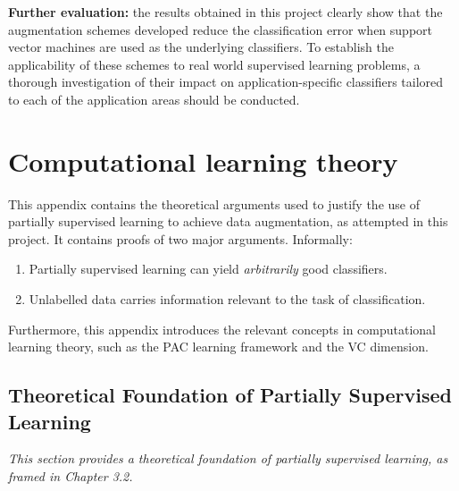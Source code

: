 \documentclass[12pt,twoside,notitlepage,amsart]{report} %
\begin{document}
\textbf{Further evaluation:} the results obtained in this project clearly show that the augmentation schemes developed reduce the classification error when support vector machines are used as the underlying classifiers. To establish the applicability of these schemes to real world supervised learning problems, a thorough investigation of their impact on application-specific classifiers tailored to each of the application areas should be conducted. 

	
		
	
	
	\cleardoublepage
	
	
	
	\cleardoublepage
	
	\appendix %
	
	\cleardoublepage
	
	\chapter{Computational learning theory}
	
	This appendix contains the theoretical arguments used to justify the use of partially supervised learning to achieve data augmentation, as attempted in this project. It contains proofs of two major arguments. Informally:
	
	\begin{enumerate} \item  Partially supervised learning can yield \emph{arbitrarily} good classifiers.
	\item  Unlabelled data carries information relevant to the task of classification. \end{enumerate}
	
	Furthermore, this appendix introduces the relevant concepts in computational learning theory, such as the PAC learning framework and the VC dimension.
	\clearpage
	
	\section{Theoretical Foundation of Partially Supervised Learning}
	
	\emph{This section provides a theoretical foundation of partially supervised learning, as framed in Chapter 3.2.} \\
	
\end{document}
